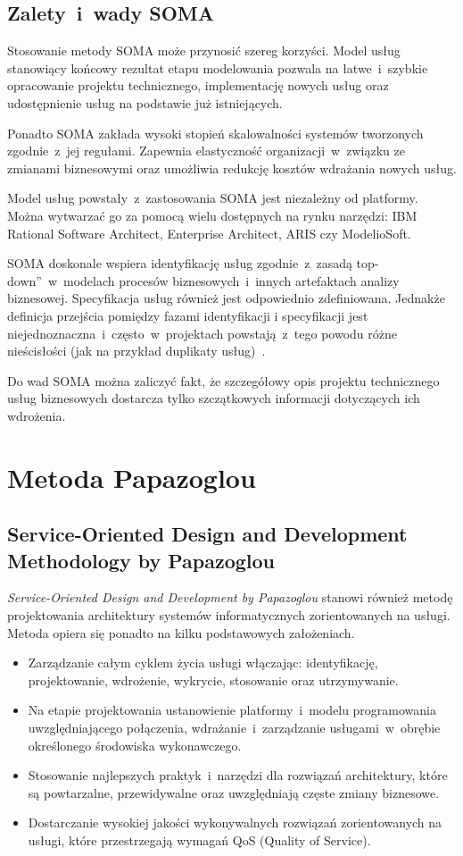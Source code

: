 \subsection{Zalety~i~wady SOMA}
Stosowanie metody SOMA może przynosić szereg korzyści. Model usług stanowiący końcowy rezultat etapu modelowania pozwala na łatwe~i~szybkie opracowanie projektu technicznego, implementację nowych usług oraz udostępnienie usług na podstawie już istniejących. 

Ponadto SOMA zakłada wysoki stopień skalowalności systemów tworzonych zgodnie~z~jej regułami. Zapewnia elastyczność organizacji~w~związku ze zmianami biznesowymi oraz umożliwia redukcję kosztów wdrażania nowych usług.

Model usług powstały~z~zastosowania SOMA jest niezależny od platformy. Można wytwarzać go za pomocą wielu dostępnych na rynku narzędzi: IBM Rational Software Architect, Enterprise Architect, ARIS czy ModelioSoft.

SOMA doskonale wspiera identyfikację usług zgodnie~z~zasadą \quotedblbase top-down\textquotedblright~w~modelach procesów biznesowych~i~innych artefaktach analizy biznesowej. Specyfikacja usług również jest odpowiednio zdefiniowana. Jednakże definicja przejścia pomiędzy fazami identyfikacji i specyfikacji jest niejednoznaczna~i~często~w~projektach powstają~z~tego powodu różne nieścisłości (jak na przykład duplikaty usług)~\cite{MicMetZIMM}. 

Do wad SOMA można zaliczyć fakt, że szczegółowy opis projektu technicznego usług biznesowych dostarcza tylko szczątkowych informacji dotyczących ich wdrożenia. 


\section{Metoda Papazoglou}
\subsection{Service-Oriented Design and Development Methodology by Papazoglou}
\emph{Service-Oriented Design and Development by Papazoglou} stanowi również metodę projektowania architektury systemów informatycznych zorientowanych na usługi. Metoda opiera się ponadto na kilku podstawowych założeniach.
\begin{itemize}
\item{Zarządzanie całym cyklem życia usługi włączając: identyfikację, projektowanie, wdrożenie, wykrycie, stosowanie oraz utrzymywanie.}
\item{Na etapie projektowania ustanowienie platformy~i~modelu programowania uwzględniającego połączenia, wdrażanie~i~zarządzanie usługami~w~obrębie określonego środowiska wykonawczego.}
\item{Stosowanie najlepszych praktyk~i~narzędzi dla rozwiązań architektury, które są powtarzalne, przewidywalne oraz uwzględniają częste zmiany biznesowe.}
\item{Dostarczanie wysokiej jakości wykonywalnych rozwiązań zorientowanych na usługi, które przestrzegają wymagań QoS (Quality of Service)}.
\end{itemize}

